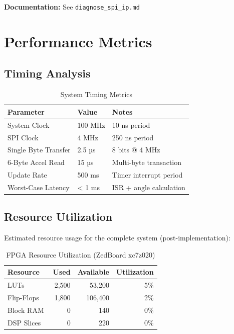 \documentclass[11pt,a4paper]{article}
\begin{document}
\textbf{Documentation:} See \texttt{diagnose\_spi\_ip.md}

\section{Performance Metrics}

\subsection{Timing Analysis}

\begin{table}[H]
\centering
\caption{System Timing Metrics}
\begin{tabular}{@{}lll@{}}
\toprule
\textbf{Parameter} & \textbf{Value} & \textbf{Notes} \\ \midrule
System Clock & 100 MHz & 10 ns period \\
SPI Clock & 4 MHz & 250 ns period \\
Single Byte Transfer & 2.5 µs & 8 bits @ 4 MHz \\
6-Byte Accel Read & 15 µs & Multi-byte transaction \\
Update Rate & 500 ms & Timer interrupt period \\
Worst-Case Latency & < 1 ms & ISR + angle calculation \\ \bottomrule
\end{tabular}
\end{table}

\subsection{Resource Utilization}

Estimated resource usage for the complete system (post-implementation):

\begin{table}[H]
\centering
\caption{FPGA Resource Utilization (ZedBoard xc7z020)}
\begin{tabular}{@{}lrrr@{}}
\toprule
\textbf{Resource} & \textbf{Used} & \textbf{Available} & \textbf{Utilization} \\ \midrule
LUTs & ~2,500 & 53,200 & ~5\% \\
Flip-Flops & ~1,800 & 106,400 & ~2\% \\
Block RAM & 0 & 140 & 0\% \\
DSP Slices & 0 & 220 & 0\% \\ \bottomrule
\end{tabular}
\end{table}
\end{document}
